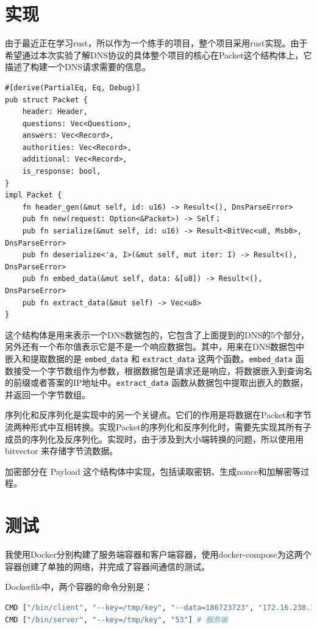 \documentclass[UTF8]{ctexart}
\begin{document}
	\section{实现}

	由于最近正在学习rust，所以作为一个练手的项目，整个项目采用rust实现。由于希望通过本次实验了解DNS协议的具体整个项目的核心在Packet这个结构体上，它描述了构建一个DNS请求需要的信息。

\begin{lstlisting}
#[derive(PartialEq, Eq, Debug)]
pub struct Packet {
    header: Header,
    questions: Vec<Question>,
    answers: Vec<Record>,
    authorities: Vec<Record>,
    additional: Vec<Record>,
    is_response: bool,
}
impl Packet {
	fn header_gen(&mut self, id: u16) -> Result<(), DnsParseError>
    pub fn new(request: Option<&Packet>) -> Self；
	pub fn serialize(&mut self, id: u16) -> Result<BitVec<u8, Msb0>, DnsParseError>
	pub fn deserialize<'a, I>(&mut self, mut iter: I) -> Result<(), DnsParseError>
	pub fn embed_data(&mut self, data: &[u8]) -> Result<(), DnsParseError>
	pub fn extract_data(&mut self) -> Vec<u8>
}
\end{lstlisting}

	这个结构体是用来表示一个DNS数据包的，它包含了上面提到的DNS的5个部分，另外还有一个布尔值表示它是不是一个响应数据包。其中，用来在DNS数据包中嵌入和提取数据的是 \lstinline{embed_data} 和 \lstinline{extract_data} 这两个函数。\lstinline{embed_data} 函数接受一个字节数组作为参数，根据数据包是请求还是响应，将数据嵌入到查询名的前缀或者答案的IP地址中。\lstinline{extract_data} 函数从数据包中提取出嵌入的数据，并返回一个字节数组。

	序列化和反序列化是实现中的另一个关键点。它们的作用是将数据在Packet和字节流两种形式中互相转换。实现Packet的序列化和反序列化时，需要先实现其所有子成员的序列化及反序列化。实现时，由于涉及到大小端转换的问题，所以使用用 bitvector 来存储字节流数据。

	加密部分在 Payload 这个结构体中实现，包括读取密钥、生成nonce和加解密等过程。

	\section{测试}

	我使用Docker分别构建了服务端容器和客户端容器，使用docker-compose为这两个容器创建了单独的网络，并完成了容器间通信的测试。

	Dockerfile中，两个容器的命令分别是：

	\begin{lstlisting}[language=bash]
CMD ["/bin/client", "--key=/tmp/key", "--data=186723723", "172.16.238.11", "53"] # 客户端
CMD ["/bin/server", "--key=/tmp/key", "53"] # 服务端
	\end{lstlisting}
\end{document}
